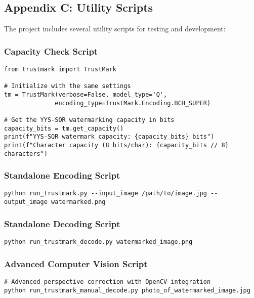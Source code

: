 \documentclass[12pt,a4paper]{article}
\begin{document}
\subsection{Appendix C: Utility Scripts}

The project includes several utility scripts for testing and development:

\subsubsection{Capacity Check Script}
\begin{lstlisting}[caption=check_capacity.py]
from trustmark import TrustMark

# Initialize with the same settings
tm = TrustMark(verbose=False, model_type='Q', 
              encoding_type=TrustMark.Encoding.BCH_SUPER)

# Get the YYS-SQR watermarking capacity in bits
capacity_bits = tm.get_capacity()
print(f"YYS-SQR watermark capacity: {capacity_bits} bits")
print(f"Character capacity (8 bits/char): {capacity_bits // 8} characters")
\end{lstlisting}

\subsubsection{Standalone Encoding Script}
\begin{lstlisting}[caption=run_trustmark.py Usage]
python run_trustmark.py --input_image /path/to/image.jpg --output_image watermarked.png
\end{lstlisting}

\subsubsection{Standalone Decoding Script}
\begin{lstlisting}[caption=run_trustmark_decode.py Usage]
python run_trustmark_decode.py watermarked_image.png
\end{lstlisting}

\subsubsection{Advanced Computer Vision Script}
\begin{lstlisting}[caption=run_trustmark_manual_decode.py Usage]
# Advanced perspective correction with OpenCV integration
python run_trustmark_manual_decode.py photo_of_watermarked_image.jpg
\end{lstlisting}
\end{document}

